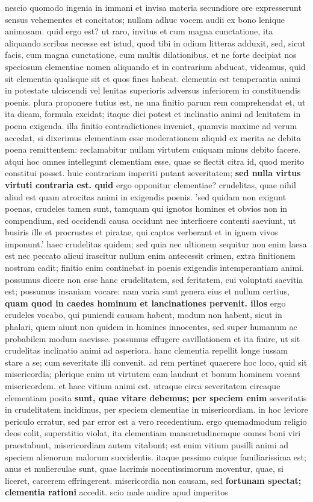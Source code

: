 nescio quomodo ingenia in immani et invisa materia secundiore ore expresserunt sensus vehementes et concitatos; nullam adhuc vocem audii ex bono lenique animosam. quid ergo est? ut raro, invitus et cum magna cunctatione, ita aliquando scribas necesse est istud, quod tibi in odium litteras adduxit, sed, sicut facis, cum magna cunctatione, cum multis dilationibus. et ne forte decipiat nos speciosum clementiae nomen aliquando et in contrarium abducat, videamus, quid sit clementia qualisque sit et quos fines habeat. clementia est temperantia animi in potestate ulciscendi vel lenitas superioris adversus inferiorem in constituendis poenis. plura proponere tutius est, ne una finitio parum rem comprehendat et, ut ita dicam, formula excidat; itaque dici potest et inclinatio animi ad lenitatem in poena exigenda. illa finitio contradictiones inveniet, quamvis maxime ad verum accedat, si dixerimus clementiam esse moderationem aliquid ex merita ac debita poena remittentem: reclamabitur nullam virtutem cuiquam minus debito facere. atqui hoc omnes intellegunt clementiam esse, quae se flectit citra id, quod merito constitui posset. huic contrariam imperiti putant severitatem; \textbf{sed \textbf{nulla virtus virtuti contraria est.} quid} ergo opponitur clementiae? crudelitas, quae nihil aliud est quam atrocitas animi in exigendis poenis. 'sed quidam non exigunt poenas, crudeles tamen sunt, tamquam qui ignotos homines et obvios non in compendium, sed occidendi causa occidunt nec interficere contenti saeviunt, ut busiris ille et procrustes et piratae, qui captos verberant et in ignem vivos imponunt.' haec crudelitas quidem; sed quia nec ultionem sequitur non enim laesa est nec peccato alicui irascitur nullum enim antecessit crimen, extra finitionem nostram cadit; finitio enim continebat in poenis exigendis intemperantiam animi. possumus dicere non esse hanc crudelitatem, sed feritatem, cui voluptati saevitia est; possumus insaniam vocare: nam varia sunt genera eius et nullum certius, \textbf{quam quod in caedes hominum \textbf{et lancinationes} pervenit. illos} ergo crudeles vocabo, qui puniendi causam habent, modum non habent, sicut in phalari, quem aiunt non quidem in homines innocentes, sed super humanum ac probabilem modum saevisse. possumus effugere cavillationem et ita finire, ut sit crudelitas inclinatio animi ad asperiora. hanc clementia repellit longe iussam stare a se; cum severitate illi convenit. ad rem pertinet quaerere hoc loco, quid sit misericordia; plerique enim ut virtutem eam laudant et bonum hominem vocant misericordem. et haec vitium animi est. utraque circa severitatem circaque clementiam posita \textbf{sunt, quae vitare debemus; per speciem enim} severitatis in crudelitatem incidimus, per speciem clementiae in misericordiam. in hoc leviore periculo erratur, sed par error est a vero recedentium. ergo quemadmodum religio deos colit, superstitio violat, ita clementiam mansuetudinemque omnes boni viri praestabunt, misericordiam autem vitabunt; est enim vitium pusilli animi ad speciem alienorum malorum succidentis. itaque pessimo cuique familiarissima est; anus et mulierculae sunt, quae lacrimis nocentissimorum moventur, quae, si liceret, carcerem effringerent. misericordia non causam, sed \textbf{fortunam spectat; clementia rationi} accedit. scio male audire apud imperitos 